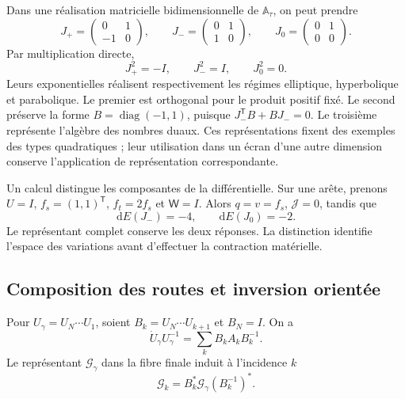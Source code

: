 Dans une réalisation matricielle bidimensionnelle de \(\mathbb A_\tau\), on peut prendre
\[
 J_{+}=\begin{pmatrix}0&1\\-1&0\end{pmatrix},\qquad
 J_{-}=\begin{pmatrix}0&1\\1&0\end{pmatrix},\qquad
 J_{0}=\begin{pmatrix}0&1\\0&0\end{pmatrix}.
\]
Par multiplication directe,
\[
 J_+^2=-I,\qquad J_-^2=I,\qquad J_0^2=0.
\]
Leurs exponentielles réalisent respectivement les régimes elliptique, hyperbolique et parabolique. Le premier est orthogonal pour le produit positif fixé. Le second préserve la forme \(B=\operatorname{diag}(-1,1)\), puisque \(J_-^{\mathsf T}B+BJ_-=0\). Le troisième représente l'algèbre des nombres duaux. Ces représentations fixent des exemples des types quadratiques ; leur utilisation dans un écran d'une autre dimension conserve l'application de représentation correspondante.

Un calcul distingue les composantes de la différentielle. Sur une arête,
prenons \(U=I\), \(f_s=(1,1)^{\mathsf T}\),
\(f_t=2f_s\) et \(\mathsf W=I\). Alors \(q=v=f_s\),
\(\mathcal J=0\), tandis que
\begin{equation}
 \mathrm dE(J_-)=-4,\qquad \mathrm dE(J_0)=-2.
 \label{vii:vii:eq:control-regimenes-corriente}
\end{equation}
Le représentant complet conserve les deux réponses. La distinction
identifie l'espace des variations avant d'effectuer la contraction
matérielle.

\subsection{Composition des routes et inversion orientée}

\begin{proposition}
\label{vii:vii:prop:pullback-invertible}
Pour \(U_\gamma=U_N\cdots U_1\), soient
\(B_k=U_N\cdots U_{k+1}\) et \(B_N=I\). On a
\[
 \dot U_\gamma U_\gamma^{-1}
   =\sum_kB_kA_kB_k^{-1}.
\]
Le représentant \(\mathcal G_\gamma\) dans la fibre finale induit
à l'incidence \(k\)
\begin{equation}
 \mathcal G_k=B_k^*\mathcal G_\gamma(B_k^{-1})^*.
 \label{vii:vii:eq:transporte-contragrediente}
\end{equation}
\end{proposition}

